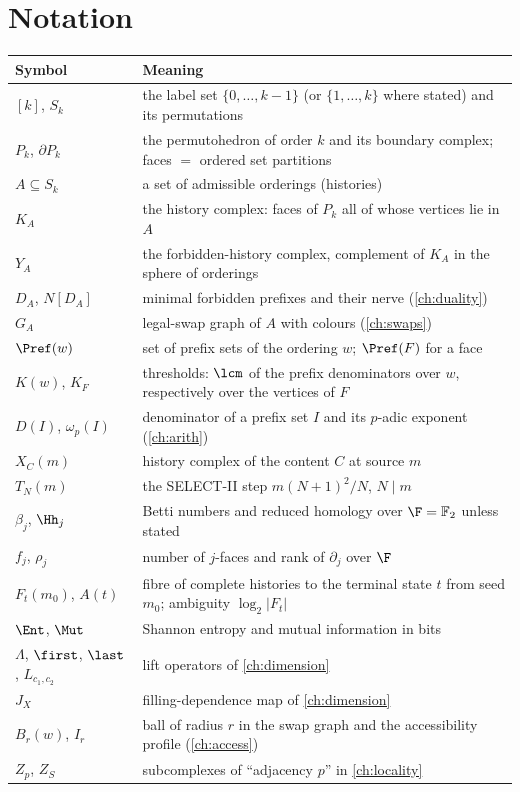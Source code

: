 \appendix

\chapter{Notation}\label{app:notation}
\begin{center}\footnotesize\setlength{\tabcolsep}{4pt}
\begin{longtable}{@{}p{3.2cm}p{9.8cm}@{}}
\toprule Symbol & Meaning\\\midrule\endhead
$[k]$, $S_k$ & the label set $\{0,\dots,k-1\}$ (or $\{1,\dots,k\}$ where stated) and its permutations\\
$P_k$, $\partial P_k$ & the permutohedron of order $k$ and its boundary complex; faces $=$ ordered set partitions\\
$A\subseteq S_k$ & a set of admissible orderings (histories)\\
$K_A$ & the history complex: faces of $P_k$ all of whose vertices lie in $A$\\
$Y_A$ & the forbidden-history complex, complement of $K_A$ in the sphere of orderings\\
$D_A$, $N[D_A]$ & minimal forbidden prefixes and their nerve (\cref{ch:duality})\\
$G_A$ & legal-swap graph of $A$ with colours (\cref{ch:swaps})\\
$\Pref(w)$ & set of prefix sets of the ordering $w$; $\Pref(F)$ for a face\\
$K(w)$, $K_F$ & thresholds: $\lcm$ of the prefix denominators over $w$, respectively over the vertices of $F$\\
$D(I)$, $\omega_p(I)$ & denominator of a prefix set $I$ and its $p$-adic exponent (\cref{ch:arith})\\
$X_C(m)$ & history complex of the content $C$ at source $m$\\
$T_N(m)$ & the SELECT-II step $m(N+1)^2/N$, $N\mid m$\\
$\beta_j$, $\Hh_j$ & Betti numbers and reduced homology over $\F=\mathbb F_2$ unless stated\\
$f_j$, $\rho_j$ & number of $j$-faces and rank of $\partial_j$ over $\F$\\
$F_t(m_0)$, $A(t)$ & fibre of complete histories to the terminal state $t$ from seed $m_0$; ambiguity $\log_2|F_t|$\\
$\Ent$, $\Mut$ & Shannon entropy and mutual information in bits\\
$\Lambda$, $\first$, $\last$, $L_{c_1,c_2}$ & lift operators of \cref{ch:dimension}\\
$J_X$ & filling-dependence map of \cref{ch:dimension}\\
$B_r(w)$, $I_r$ & ball of radius $r$ in the swap graph and the accessibility profile (\cref{ch:access})\\
$Z_p$, $Z_S$ & subcomplexes of ``adjacency $p$'' in \cref{ch:locality}\\
\bottomrule
\end{longtable}\end{center}

